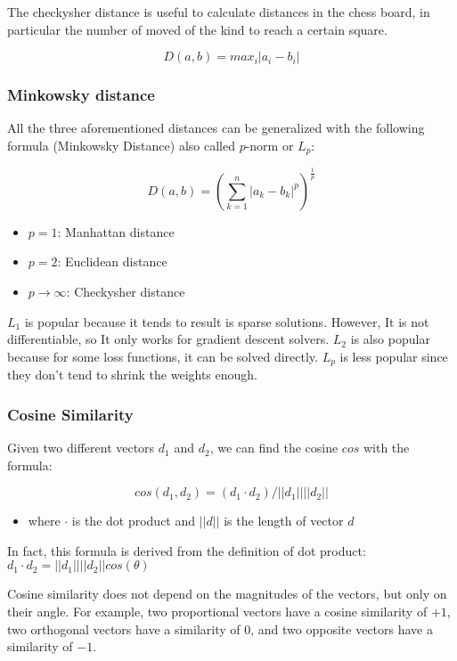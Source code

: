 \documentclass[11pt]{article}
\begin{document}
The checkysher distance is useful to calculate distances in the chess
board, in particular the number of moved of the kind to reach a certain
square.

\[D(a, b)=max_i|a_i-b_i|\]

\subsubsection{Minkowsky distance}\label{minkowsky-distance}

All the three aforementioned distances can be generalized with the
following formula (Minkowsky Distance) also called \(p\)-norm or
\(L_p\):

\[D(a, b) = (\sum_{k=1}^{n} |a_k - b_k|^p)^{\frac{1}{p}}\]

\begin{itemize}
\tightlist
\item
  \(p=1\): Manhattan distance
\item
  \(p=2\): Euclidean distance
\item
  \(p\to\infty\): Checkysher distance
\end{itemize}

\(L_1\) is popular because it tends to result is sparse solutions.
However, It is not differentiable, so It only works for gradient descent
solvers. \(L_2\) is also popular because for some loss functions, it can
be solved directly. \(L_p\) is less popular since they don't tend to
shrink the weights enough.

\subsubsection{Cosine Similarity}\label{cosine-similarity}

Given two different vectors \(d_1\) and \(d_2\), we can find the cosine
\(cos\) with the formula:

\[cos(d_1, d_2) = (d_1 \cdot d_2) / ||d_1|| ||d_2||\]

\begin{itemize}
\tightlist
\item
  where \(\cdot\) is the dot product and \(||d||\) is the length of
  vector \(d\)
\end{itemize}

In fact, this formula is derived from the definition of dot product:
\(d_1 \cdot d_2 = ||d_1||||d_2||cos(\theta)\)

Cosine similarity does not depend on the magnitudes of the vectors, but
only on their angle. For example, two proportional vectors have a cosine
similarity of \(+1\), two orthogonal vectors have a similarity of \(0\),
and two opposite vectors have a similarity of \(-1\).
\end{document}

